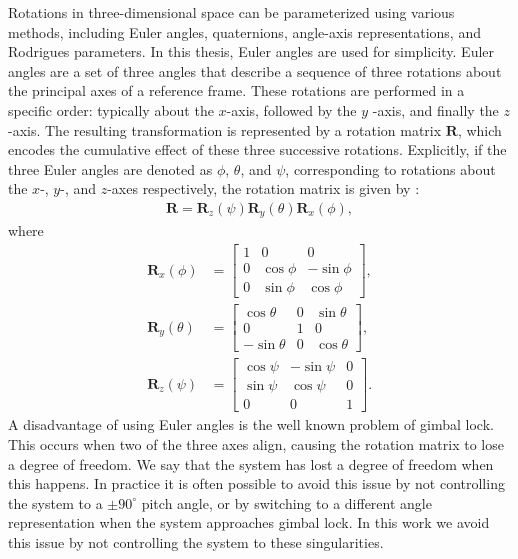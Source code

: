 Rotations in three-dimensional space can be parameterized using various methods,
including Euler angles, quaternions, angle-axis representations, and
Rodrigues parameters. In this thesis, Euler angles are used for simplicity.
Euler angles are a set of three angles that describe a sequence of three
rotations about the principal axes of a reference frame. These rotations are
performed in a specific order: typically about the $x$-axis, followed by the $y$
-axis, and finally the $z$-axis. The resulting transformation is represented by
a rotation matrix $\bm{R}$, which encodes the cumulative effect of these three
successive rotations.
Explicitly, if the three Euler angles are denoted as $\phi$, $\theta$, and $\psi$,
corresponding to rotations about the $x$-, $y$-, and $z$-axes respectively,
the rotation matrix is given by \cite{modsim}:
\begin{align}
    \bm{R} = \bm{R}_z(\psi) \bm{R}_y(\theta) \bm{R}_x(\phi),
\end{align}
where
\begin{subequations}
\label{eq:bp:so3:rotations}
\begin{align}
    \bm{R}_x(\phi) &= \begin{bmatrix}
        1 & 0 & 0 \\
        0 & \cos\phi & -\sin\phi \\
        0 & \sin\phi & \cos\phi
    \end{bmatrix}, \\
    \bm{R}_y(\theta) &= \begin{bmatrix}
        \cos\theta & 0 & \sin\theta \\
        0 & 1 & 0 \\
        -\sin\theta & 0 & \cos\theta
    \end{bmatrix}, \\
    \bm{R}_z(\psi) &= \begin{bmatrix}
        \cos\psi & -\sin\psi & 0 \\
        \sin\psi & \cos\psi & 0 \\
        0 & 0 & 1
    \end{bmatrix}.
\end{align}
\end{subequations}
A disadvantage of using Euler angles is the well known problem of gimbal lock.
This occurs when two of the three axes align, causing the rotation matrix to
lose a degree of freedom. We say that the system has lost a degree of freedom
when this happens. In practice it is often possible to avoid this issue by not
controlling the system to a $\pm90^\circ$ pitch angle, or by switching to a
different angle representation when the system approaches gimbal lock. In this
work we avoid this issue by not controlling the system to these singularities.

